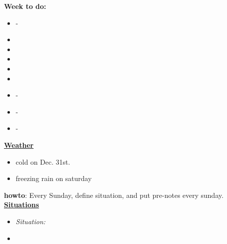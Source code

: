 \documentclass[11pt]{article}
\begin{document}
{            %
            \textbf{Week to do:} 
            \begin{itemize}
              \small \item \small - 
            \item \small
            \item \small
            \item \small
            \item \small
            \item \small
            \item \small - 
            \item \small - 
            \item \small - 
            \end{itemize} 
            \newpage 
            \textbf{\small \underline{Weather}} 
            \begin{itemize} 
              \tiny \item \tiny cold on Dec. 31st.
            \item \tiny freezing rain on saturday 
            \end{itemize}
            

            
            \textbf{howto}: Every Sunday, define situation, and put pre-notes every sunday. \\
            \textbf{\small \underline{Situations}} \\ 
            \begin{itemize}
            \item \tiny \textit{Situation:}
           \item \tiny 
            \end{itemize} 
          
}
\end{document}
